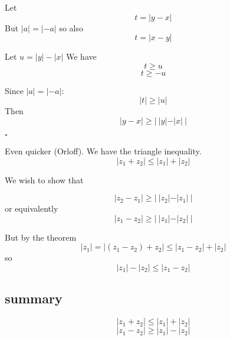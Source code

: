 \documentclass[11pt, oneside]{article}
\begin{document}
Let 
\[ t = |y-x|  \]
But $|a| = |-a|$ so also
\[ t = |x-y|  \]

Let $u = |y| - |x|$  We have
\[ t \ge u \]
\[ t \ge -u \]

Since $|a| = |-a|$:
\[ |t| \ge |u| \]
Then
\[ |y-x| \ge | \ |y| - |x| \ | \]

$\square$

Even quicker (Orloff).  We have the triangle inequality.
\[ |z_1 + z_2| \le |z_1| + |z_2| \]

We wish to show that

\[ |z_2 - z_1| \ge | \ |z_2| - |z_1| \ | \]
or equivalently
\[ |z_1 - z_2| \ge | \ |z_1| - |z_2| \ | \]

But by the theorem
\[ |z_1| = |(z_1 - z_2) + z_2| \le |z_1 - z_2| + |z_2| \]
so
\[ |z_1| -  |z_2| \le |z_1 - z_2| \]

\subsection*{summary}
\[ |z_1 + z_2| \le |z_1| + |z_2| \]
\[ |z_1 - z_2| \ge |z_1| -  |z_2| \]
\end{document}
